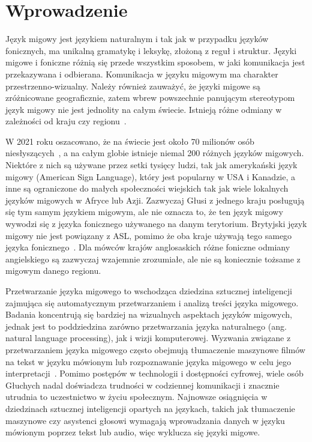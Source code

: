 \hypersetup{pageanchor=true}

\chapter{Wprowadzenie}\label{ch:introduction}

Język migowy jest językiem naturalnym i tak jak w przypadku języków fonicznych, ma unikalną gramatykę i leksykę, złożoną z reguł i struktur. Języki migowe i foniczne różnią się przede wszystkim sposobem, w jaki komunikacja jest przekazywana i odbierana. Komunikacja w języku migowym ma charakter przestrzenno-wizualny. Należy również zauważyć, że języki migowe są zróżnicowane geograficznie, zatem wbrew powszechnie panującym stereotypom język migowy nie jest jednolity na całym świecie. Istnieją różne odmiany w zależności od kraju czy regionu~\cite{stokoe1980}.

W 2021 roku oszacowano, że na świecie jest około 70 milionów osób niesłyszących~\cite{who2021}, a na całym globie istnieje niemal 200 różnych języków migowych. Niektóre z nich są używane przez setki tysięcy ludzi, tak jak amerykański język migowy (American Sign Language), który jest popularny w USA i Kanadzie, a inne są ograniczone do małych społeczności wiejskich tak jak wiele lokalnych języków migowych w Afryce lub Azji. Zazwyczaj Głusi z jednego kraju posługują się tym samym językiem migowym, ale nie oznacza to, że ten język migowy wywodzi się z języka fonicznego używanego na danym terytorium. Brytyjski język migowy nie jest powiązany z ASL, pomimo że oba kraje używają tego samego języka fonicznego~\cite{rutkowski2016}. Dla mówców krajów anglosaskich różne foniczne odmiany angielskiego są zazwyczaj wzajemnie zrozumiałe, ale nie są koniecznie tożsame z migowym danego regionu.

Przetwarzanie języka migowego to wschodząca dziedzina sztucznej inteligencji zajmująca się automatycznym przetwarzaniem i analizą treści języka migowego. Badania koncentrują się bardziej na wizualnych aspektach języków migowych, jednak jest to poddziedzina zarówno przetwarzania języka naturalnego (ang. natural language processing), jak i wizji komputerowej. Wyzwania związane z przetwarzaniem języka migowego często obejmują tłumaczenie maszynowe filmów na tekst w języku mówionym lub rozpoznawanie języka migowego w celu jego interpretacji~\cite{bragg2019}. Pomimo postępów w technologii i dostępności cyfrowej, wiele osób Głuchych nadal doświadcza trudności w codziennej komunikacji i znacznie utrudnia to uczestnictwo w życiu społecznym. Najnowsze osiągnięcia w dziedzinach sztucznej inteligencji opartych na językach, takich jak tłumaczenie maszynowe czy asystenci głosowi wymagają wprowadzania danych w języku mówionym poprzez tekst lub audio, więc wyklucza się języki migowe.




